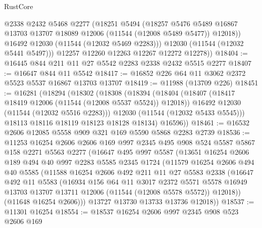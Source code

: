 \begin{lexlean}{RustCore}
\begin{coremodule}
            @2338
            @2432
            @5468
            @2277
            (@18251
              @5494
              (@18257
                @5476
                @5489
                @16867
                @13703
                @13707
                @18089
                @12006
                (@11544 (@12008 @5489 @5477))
                @12018))
            @16492
            @12030
            (@11544 (@12032 @5469 @2283)))
          @12030
          (@11544 (@12032 @5441 @5497)))
        @12257
        @12260
        @12263
        @12267
        @12272
        @12278))
@18404 := @16445 @844 @211 @11 @27 @5542 @2283 @2338 @2432 @5515 @2277
@18407 := @16647 @844 @11 @5542
@18417 := @16852 @226 @64 @11 @3062 @2372 @5523 @5537 @16867 @13703 @13707
@18419 := @11988 (@13709 @226)
@18451 := @16281
    (@18294
      (@18302
        (@18308
          (@18394
            (@18404
              (@18407 (@18417 @18419 @12006 (@11544 (@12008 @5537 @5524)) @12018))
              @16492
              @12030
              (@11544 (@12032 @5516 @2283)))
            @12030
            (@11544 (@12032 @5433 @5545)))
          @18113
          @18116
          @18119
          @18123
          @18128
          @18134)
        @16596))
@18461 := @16532 @2606 @12085 @5558 @909 @321 @169 @5590 @5868 @2283 @2739
@18536 := @11253
    @16254
    @2606
    @2606
    @169
    @997
    @2345
    @495
    @908
    @524
    @5587
    @5867
    @158
    @2271
    @5563
    @2277
    (@16647
      @495
      @997
      @5587
      (@13651
        @16254
        @2606
        @189
        @494
        @40
        @997
        @2283
        @5585
        @2345
        @1724
        (@11579
          @16254
          @2606
          @494
          @40
          @5585
          (@11588
            @16254
            @2606
            @492
            @211
            @11
            @27
            @5583
            @2338
            (@16647
              @492
              @11
              @5583
              (@16934
                @156
                @64
                @11
                @3017
                @2372
                @5571
                @5578
                @16949
                @13703
                @13707
                @13711
                @12006
                (@11544 (@12008 @5578 @5572))
                @12018))
            (@11648 @16254 @2606)))
        @13727
        @13730
        @13733
        @13736
        @12018))
@18537 := @11301 @16254
@18554 := @18537
    @16254
    @2606
    @997
    @2345
    @908
    @523
    @2606
    @169

\end{coremodule}
\end{lexlean}
